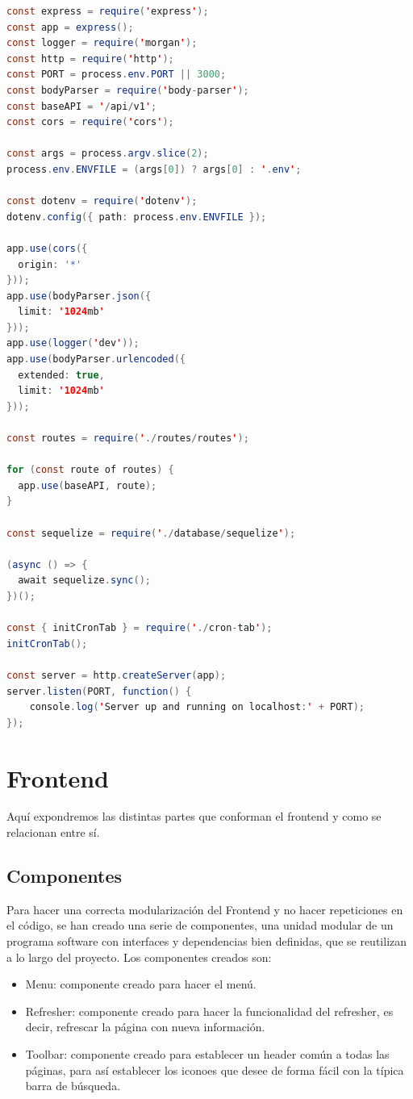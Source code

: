 \begin{lstlisting}[language=Java,caption={App.js},captionpos=b]
const express = require('express');
const app = express();
const logger = require('morgan');
const http = require('http');
const PORT = process.env.PORT || 3000;
const bodyParser = require('body-parser');
const baseAPI = '/api/v1';
const cors = require('cors');

const args = process.argv.slice(2);
process.env.ENVFILE = (args[0]) ? args[0] : '.env';

const dotenv = require('dotenv');
dotenv.config({ path: process.env.ENVFILE });

app.use(cors({
  origin: '*'
}));
app.use(bodyParser.json({
  limit: '1024mb'
}));
app.use(logger('dev'));
app.use(bodyParser.urlencoded({
  extended: true,
  limit: '1024mb'
}));

const routes = require('./routes/routes');

for (const route of routes) {
  app.use(baseAPI, route);
}

const sequelize = require('./database/sequelize');

(async () => {
  await sequelize.sync();
})();

const { initCronTab } = require('./cron-tab');
initCronTab();

const server = http.createServer(app);
server.listen(PORT, function() {
    console.log('Server up and running on localhost:' + PORT);
});
\end{lstlisting}

\section{Frontend}
Aquí expondremos las distintas partes que conforman el frontend y como se relacionan entre sí.

\subsection{Componentes}
Para hacer una correcta modularización del Frontend y no hacer repeticiones en el código, se han creado una serie de componentes, una unidad modular de un programa software con interfaces y dependencias bien definidas, que se reutilizan a lo largo del proyecto. Los componentes creados son:

\begin{itemize}
    \item Menu: componente creado para hacer el menú.
    \item Refresher: componente creado para hacer la funcionalidad del refresher, es decir, refrescar la página con nueva información.
    \item Toolbar: componente creado para establecer un header común a todas las páginas, para así establecer los iconoes que desee de forma fácil con la típica barra de búsqueda.
\end{itemize}

